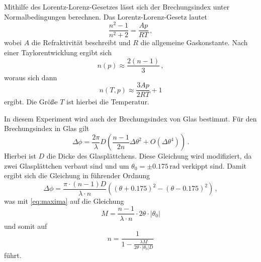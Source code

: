 Mithilfe des Lorentz-Lorenz-Gesetzes lässt sich der Brechungsindex unter Normalbedingungen berechnen. Das Lorentz-Lorenz-Gesetz lautet
\begin{equation*}
    \frac{n^2 - 1}{n^2 + 2} = \frac{A p}{R T} \, ,
\end{equation*}
wobei $A$ die Refraktivität beschreibt und $R$ die allgemeine Gaskonstante. Nach einer Taylorentwicklung ergibt sich
\begin{equation*}
    n(p) \approx \frac{2 (n-1)}{3} \, ,
\end{equation*} 
woraus sich dann
\begin{equation} \label{eq:lorentz}
    n (T,p) \approx \frac{3 A p}{ 2 R T} + 1
\end{equation}
ergibt. Die Größe $T$ ist hierbei die Temperatur.

In diesem Experiment wird auch der Brechungsindex von Glas bestimmt. Für den Brechungsindex in Glas gilt
\begin{equation}\label{eq:phiglas}
    \Delta \phi = \frac{2\pi}{\lambda}D\left(\frac{n-1}{2n}\Delta \theta^2+O( \Delta \theta^4)\right) \, .
\end{equation}
Hierbei ist $D$ die Dicke des Glasplättchens.
Diese Gleichung wird modifiziert, da zwei Glasplättchen verbaut sind und um $\theta_0 = \pm 0.175\,\text{rad}$ verkippt sind. Damit ergibt sich die Gleichung in führender Ordnung
\begin{equation}
    \Delta \phi = \frac{\pi \cdot (n - 1) D}{\lambda \cdot n} \left(\left( \theta + 0.175 \right)^2 - \left( \theta - 0.175 \right)^2\right) \, ,
\end{equation}
was mit \autoref{eq:maxima} auf die Gleichung
\begin{equation*}
    M = \frac{n - 1}{\lambda \cdot n} \cdot 2 \theta \cdot |\theta_0|
\end{equation*}
und somit auf
\begin{equation} \label{eq:n_Glas}
    n = \frac{1}{1- \frac{\lambda M}{ 2 \theta \cdot |\theta_0| D}}
\end{equation}
führt.